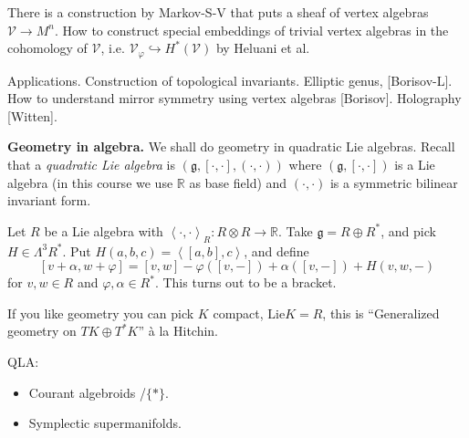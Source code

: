 There is a construction by Markov-S-V that puts a sheaf
of vertex algebras $\mathcal{V} \to M^n$.
How to construct special embeddings of trivial vertex algebras
in the cohomology of $\mathcal{V}$, i.e.
$\mathcal{V}_\varphi \hookrightarrow H^*(\mathcal{V})$
by Heluani et al.

\medskip\noindent
Applications. Construction of topological invariants.
Elliptic genus, [Borisov-L].
How to understand mirror symmetry using vertex algebras [Borisov].
Holography [Witten].

\medskip\noindent
{\bf Geometry in algebra.}
We shall do geometry in quadratic Lie algebras.
Recall that a {\it quadratic Lie algebra} is
 $(\mathfrak{g},[\cdot,\cdot], (\cdot,\cdot))$ where
$(\mathfrak{g},[\cdot,\cdot])$ is a Lie algebra
(in this course we use $\mathbb{R}$ as base field)
and $(\cdot,\cdot)$ is a symmetric bilinear invariant form.

\begin{example}
\label{example-quadratic-Lie-algebra}
Let $R$ be a Lie algebra with
$\left<\cdot,\cdot\right>_R: R \otimes R \to \mathbb{R}$.
Take $\mathfrak{g}=R \oplus R^*$,
and pick $H \in \Lambda^{3}R^*$.
Put $H(a,b,c)=\left<[a,b],c\right>$, and define
$$
[v+\alpha,w+\varphi]=[v,w]-\varphi([v,-])+\alpha([v,-])+H(v,w,-)
$$
for $v,w \in R$ and $\varphi,\alpha \in R ^*$. This turns out to be a bracket.

If you like geometry you can pick $K$ compact, $\text{Lie}K=R$,
this is ``Generalized geometry on $T K \oplus T^* K$'' 
à la Hitchin.
\end{example}

\medskip\noindent
QLA:
\begin{itemize}
\item Courant algebroids /$\{*\}$.
\item  Symplectic supermanifolds.
\end{itemize}

